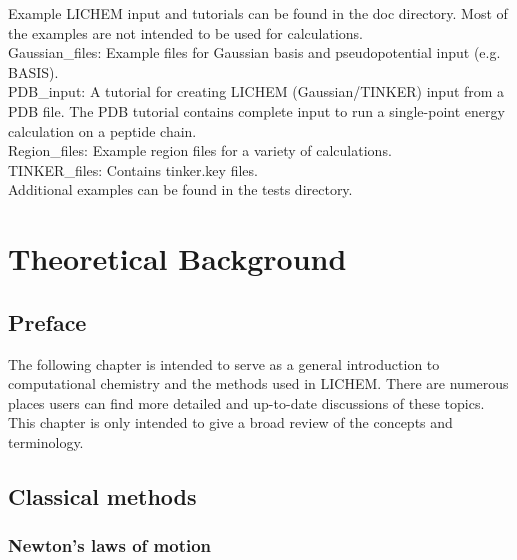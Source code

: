 \documentclass[12pt]{report}
\begin{document}
Example LICHEM input and tutorials can be found in the doc directory.
Most of the examples are not intended to be used for calculations. \\

Gaussian\_files: Example files for Gaussian basis and pseudopotential
input (e.g. BASIS). \\

PDB\_input: A tutorial for creating LICHEM (Gaussian/TINKER) input from a
PDB file.
The PDB tutorial contains complete input to run a single-point energy
calculation on a peptide chain. \\

Region\_files: Example region files for a variety of calculations. \\

TINKER\_files: Contains tinker.key files. \\

Additional examples can be found in the tests directory.

\chapter{Theoretical Background}
\label{chap:Theory}

\section{Preface}

The following chapter is intended to serve as a general introduction to
computational chemistry and the methods used in LICHEM.
There are numerous places users can find more detailed and up-to-date
discussions of these topics.
This chapter is only intended to give a broad review of the concepts and
terminology.

\section{Classical methods}

\subsection{Newton's laws of motion}
\end{document}
